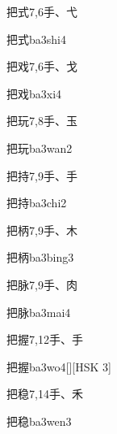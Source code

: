 \begin{entry}{把式}{7,6}{⼿、⼷}
  \begin{phonetics}{把式}{ba3shi4}
  \end{phonetics}
\end{entry}

\begin{entry}{把戏}{7,6}{⼿、⼽}
  \begin{phonetics}{把戏}{ba3xi4}
  \end{phonetics}
\end{entry}

\begin{entry}{把玩}{7,8}{⼿、⽟}
  \begin{phonetics}{把玩}{ba3wan2}
  \end{phonetics}
\end{entry}

\begin{entry}{把持}{7,9}{⼿、⼿}
  \begin{phonetics}{把持}{ba3chi2}
  \end{phonetics}
\end{entry}

\begin{entry}{把柄}{7,9}{⼿、⽊}
  \begin{phonetics}{把柄}{ba3bing3}
  \end{phonetics}
\end{entry}

\begin{entry}{把脉}{7,9}{⼿、⾁}
  \begin{phonetics}{把脉}{ba3mai4}
  \end{phonetics}
\end{entry}

\begin{entry}{把握}{7,12}{⼿、⼿}
  \begin{phonetics}{把握}{ba3wo4}[][HSK 3]
  \end{phonetics}
\end{entry}

\begin{entry}{把稳}{7,14}{⼿、⽲}
  \begin{phonetics}{把稳}{ba3wen3}
  \end{phonetics}
\end{entry}


